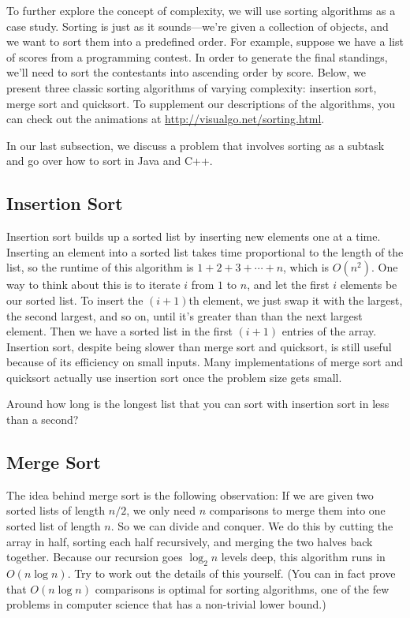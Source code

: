 To further explore the concept of complexity, we will use sorting algorithms as a case study. Sorting is just as it sounds---we're given a collection of objects, and we want to sort them into a predefined order. For example, suppose we have a list of scores from a programming contest. In order to generate the final standings, we'll need to sort the contestants into ascending order by score. Below, we present three classic sorting algorithms of varying complexity: insertion sort, merge sort and quicksort. To supplement our descriptions of the algorithms, you can check out the animations at \url{http://visualgo.net/sorting.html}.

In our last subsection, we discuss a problem that involves sorting as a subtask and go over how to sort in Java and C++.

\subsection{Insertion Sort}

Insertion sort builds up a sorted list by inserting new elements one at a time. Inserting an element into a sorted list takes time proportional to the length of the list, so the runtime of this algorithm is $1 + 2 + 3 + \cdots + n$, which is $O(n^2)$. One way to think about this is to iterate $i$ from $1$ to $n$, and let the first $i$ elements be our sorted list. To insert the $(i+1)$th element, we just swap it with the largest, the second largest, and so on, until it's greater than than the next largest element. Then we have a sorted list in the first $(i+1)$ entries of the array. Insertion sort, despite being slower than merge sort and quicksort, is still useful because of its efficiency on small inputs. Many implementations of merge sort and quicksort actually use insertion sort once the problem size gets small.

Around how long is the longest list that you can sort with insertion sort in less than a second?

\subsection{Merge Sort}

The idea behind merge sort is the following observation: If we are given two sorted lists of length $n/2$, we only need $n$ comparisons to merge them into one sorted list of length $n$. So we can divide and conquer. We do this by cutting the array in half, sorting each half recursively, and merging the two halves back together. Because our recursion goes $\log_2 n$ levels deep, this algorithm runs in $O(n \log n)$. Try to work out the details of this yourself. (You can in fact prove that $O(n \log n)$ comparisons is optimal for sorting algorithms, one of the few problems in computer science that has a non-trivial lower bound.)

